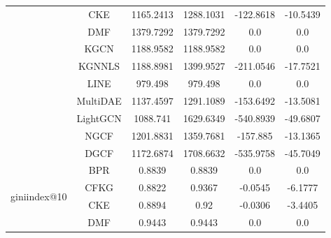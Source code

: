 \begin{table}[H]
{\begin{tabular}{|c|c|c|c|c|c|}
                                                     & CKE      & 1165.2413              & 1288.1031                 & -122.8618         & -10.5439          \\ \cline{2-6}
                                                     & DMF      & 1379.7292              & 1379.7292                 & 0.0               & 0.0               \\ \cline{2-6}
                                                     & KGCN     & 1188.9582              & 1188.9582                 & 0.0               & 0.0               \\ \cline{2-6}
                                                     & KGNNLS   & 1188.8981              & 1399.9527                 & -211.0546         & -17.7521          \\ \cline{2-6}
                                                     & LINE     & 979.498                & 979.498                   & 0.0               & 0.0               \\ \cline{2-6}
                                                     & MultiDAE & 1137.4597              & 1291.1089                 & -153.6492         & -13.5081          \\ \cline{2-6}
                                                     & LightGCN & 1088.741               & 1629.6349                 & -540.8939         & -49.6807          \\ \cline{2-6}
                                                     & NGCF     & 1201.8831              & 1359.7681                 & -157.885          & -13.1365          \\ \cline{2-6}
                                                     & DGCF     & 1172.6874              & 1708.6632                 & -535.9758         & -45.7049          \\ \hline
            \multirow{11}{*}{giniindex@10} & BPR      & 0.8839                  & 0.8839                    & 0.0               & 0.0               \\ \cline{2-6}
                                           & CFKG     & 0.8822                  & 0.9367                    & -0.0545           & -6.1777           \\ \cline{2-6}
                                           & CKE      & 0.8894                  & 0.92                      & -0.0306           & -3.4405           \\ \cline{2-6}
                                           & DMF      & 0.9443                  & 0.9443                    & 0.0               & 0.0               \\ \cline{2-6}

\end{tabular}}
\end{table}
